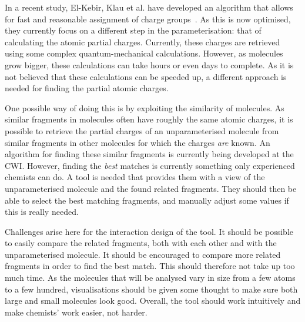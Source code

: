 In a recent study, El-Kebir, Klau et al. have developed an algorithm that allows for fast and reasonable assignment of charge groups~\cite{canzar2012charge}. As this is now optimised, they currently focus on a different step in the parameterisation: that of calculating the atomic partial charges. Currently, these charges are retrieved using some complex quantum-mechanical calculations. However, as molecules grow bigger, these calculations can take hours or even days to complete. As it is not believed that these calculations can be speeded up, a different approach is needed for finding the partial atomic charges.

One possible way of doing this is by exploiting the similarity of molecules. As similar fragments in molecules often have roughly the same atomic charges, it is possible to retrieve the partial charges of an unparameterised molecule from similar fragments in other molecules for which the charges \emph{are} known. An algorithm for finding these similar fragments is currently being developed at the CWI. However, finding the \emph{best} matches is currently something only experienced chemists can do. A tool is needed that provides them with a view of the unparameterised molecule and the found related fragments. They should then be able to select the best matching fragments, and manually adjust some values if this is really needed.

Challenges arise here for the interaction design of the tool. It should be possible to easily compare the related fragments, both with each other and with the unparameterised molecule. It should be encouraged to compare more related fragments in order to find the best match. This should therefore not take up too much time. As the molecules that will be analysed vary in size from a few atoms to a few hundred, visualisations should be given some thought to make sure both large and small molecules look good. Overall, the tool should work intuitively and make chemists' work easier, not harder.
